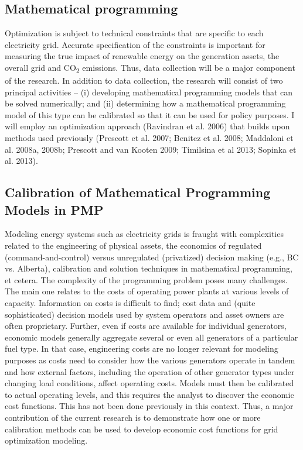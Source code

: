 \documentclass[10pt,letter]{article}
\begin{document}
\subsection{Mathematical programming}\label{mathematical-programming}

Optimization is subject to technical constraints that are specific to
each electricity grid. Accurate specification of the constraints is
important for measuring the true impact of renewable energy on the
generation assets, the overall grid and CO\textsubscript{2} emissions.
Thus, data collection will be a major component of the research. In
addition to data collection, the research will consist of two principal
activities -- (i) developing mathematical programming models that can be
solved numerically; and (ii) determining how a mathematical programming
model of this type can be calibrated so that it can be used for policy
purposes. I will employ an optimization approach (Ravindran et al. 2006)
that builds upon methods used previously (Prescott et al. 2007; Benitez
et al. 2008; Maddaloni et al. 2008a, 2008b; Prescott and van Kooten
2009; Timilsina et al 2013; Sopinka et al. 2013).

\subsection{Calibration of Mathematical Programming Models in
PMP}\label{calibration-of-mathematical-programming-models-in-pmp}

Modeling energy systems such as electricity grids is fraught with
complexities related to the engineering of physical assets, the
economics of regulated (command-and-control) versus unregulated
(privatized) decision making (e.g., BC vs. Alberta), calibration and
solution techniques in mathematical programming, et cetera. The
complexity of the programming problem poses many challenges. The main
one relates to the costs of operating power plants at various levels of
capacity. Information on costs is difficult to find; cost data and
(quite sophisticated) decision models used by system operators and asset
owners are often proprietary. Further, even if costs are available for
individual generators, economic models generally aggregate several or
even all generators of a particular fuel type. In that case, engineering
costs are no longer relevant for modeling purposes as costs need to
consider how the various generators operate in tandem and how external
factors, including the operation of other generator types under changing
load conditions, affect operating costs. Models must then be calibrated
to actual operating levels, and this requires the analyst to discover
the economic cost functions. This has not been done previously in this
context. Thus, a major contribution of the current research is to
demonstrate how one or more calibration methods can be used to develop
economic cost functions for grid optimization modeling.
\end{document}
